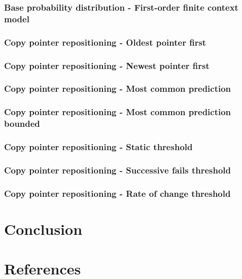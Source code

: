 \documentclass{article}
\begin{document}
\subsubsection{Base probability distribution - First-order finite context model}
\label{subsubsec:results_locate_lang_first_order_fcm}

\subsubsection{Copy pointer repositioning - Oldest pointer first}
\label{subsubsec:results_locate_lang_oldest_pointer_first}

\subsubsection{Copy pointer repositioning - Newest pointer first}
\label{subsubsec:results_locate_lang_newest_pointer_first}

\subsubsection{Copy pointer repositioning - Most common prediction}
\label{subsubsec:results_locate_lang_most_common_prediction}

\subsubsection{Copy pointer repositioning - Most common prediction bounded}
\label{subsubsec:results_locate_lang_most_common_prediction_bounded}

\subsubsection{Copy pointer repositioning - Static threshold}
\label{subsubsec:results_locate_lang_static_threshold}

\subsubsection{Copy pointer repositioning - Successive fails threshold}
\label{subsubsec:results_locate_lang_successive_fails_threshold}

\subsubsection{Copy pointer repositioning - Rate of change threshold}
\label{subsubsec:results_locate_lang_rate_of_change_threshold}




\section{Conclusion}
\label{sec:conclusion}

\section{References}


\end{document}
